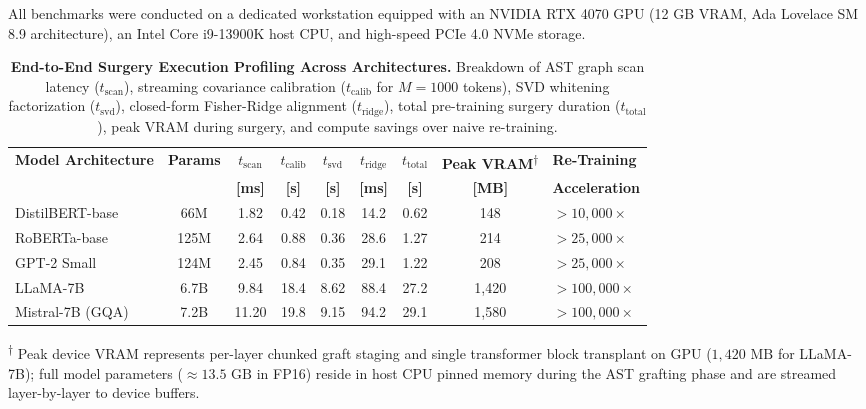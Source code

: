 All benchmarks were conducted on a dedicated workstation equipped with an NVIDIA RTX 4070 GPU (12 GB VRAM, Ada Lovelace SM 8.9 architecture), an Intel Core i9-13900K host CPU, and high-speed PCIe 4.0 NVMe storage.

\begin{table}[t]
\centering
\small
\caption[End-to-End Surgery Execution Profiling Across Architectures]{\textbf{End-to-End Surgery Execution Profiling Across Architectures.} Breakdown of AST graph scan latency ($t_{\text{scan}}$), streaming covariance calibration ($t_{\text{calib}}$ for $M=1000$ tokens), SVD whitening factorization ($t_{\text{svd}}$), closed-form Fisher-Ridge alignment ($t_{\text{ridge}}$), total pre-training surgery duration ($t_{\text{total}}$), peak VRAM during surgery, and compute savings over naive re-training.}
\label{tab:surgery_profiling}
\label{tab:surgery_profiling_master}
\setlength{\tabcolsep}{3.5pt}
\renewcommand{\arraystretch}{1.2}
\begin{tabularx}{\textwidth}{@{} l c c c c c c c >{\raggedleft\arraybackslash}X @{}}
\toprule
\textbf{Model Architecture} & \textbf{Params} & \textbf{$t_{\text{scan}}$} & \textbf{$t_{\text{calib}}$} & \textbf{$t_{\text{svd}}$} & \textbf{$t_{\text{ridge}}$} & \textbf{$t_{\text{total}}$} & \textbf{Peak VRAM}\textsuperscript{$\dagger$} & \textbf{Re-Training} \\
 & & \textbf{[ms]} & \textbf{[s]} & \textbf{[s]} & \textbf{[ms]} & \textbf{[s]} & \textbf{[MB]} & \textbf{Acceleration} \\
\midrule
DistilBERT-base & 66M & 1.82 & 0.42 & 0.18 & 14.2 & 0.62 & 148 & $>10{,}000\times$ \\
RoBERTa-base & 125M & 2.64 & 0.88 & 0.36 & 28.6 & 1.27 & 214 & $>25{,}000\times$ \\
GPT-2 Small & 124M & 2.45 & 0.84 & 0.35 & 29.1 & 1.22 & 208 & $>25{,}000\times$ \\
LLaMA-7B & 6.7B & 9.84 & 18.4 & 8.62 & 88.4 & 27.2 & 1{,}420 & $>100{,}000\times$ \\
Mistral-7B (GQA) & 7.2B & 11.20 & 19.8 & 9.15 & 94.2 & 29.1 & 1{,}580 & $>100{,}000\times$ \\
\bottomrule
\end{tabularx}
\vskip 2pt
\noindent\footnotesize \textsuperscript{$\dagger$} Peak device VRAM represents per-layer chunked graft staging and single transformer block transplant on GPU ($1{,}420\text{ MB}$ for LLaMA-7B); full model parameters ($\approx 13.5\text{ GB}$ in FP16) reside in host CPU pinned memory during the AST grafting phase and are streamed layer-by-layer to device buffers.
\end{table}

